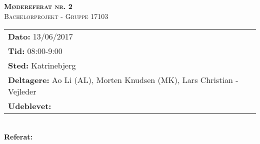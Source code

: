 
\newcommand{\HRule}{\rule{\linewidth}{0.1mm}}


	\begin{center}
		{\huge \bfseries \textsc{Mødereferat nr. 2}}\\
		\textsc{\large Bachelorprojekt - Gruppe 17103}\\[0.3cm]
	\end{center}
	\begin{tabular}{ll}
	\large \textbf{Dato:} 13/06/2017  	\\ %
	\large \textbf{Tid:}  08:00-9:00 	\\ %
	\large \textbf{Sted:} Katrinebjerg		\\ %
	\large \textbf{Deltagere:} Ao Li (AL), Morten Knudsen (MK), Lars Christian - Vejleder \\
	\large \textbf{Udeblevet:}
	\end{tabular}\\
	\phantom{\,}\hspace{0.1em} \large \textbf{Referat:}
